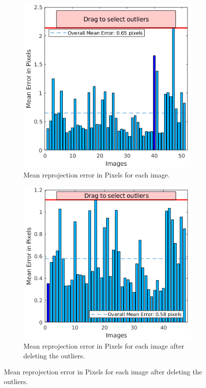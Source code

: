 \begin{figure}[H]
	\centering
	\begin{subfigure}[b]{0.45\textwidth}
		\includegraphics[width=\textwidth]{graphics/stats.png}
		\caption{Mean reprojection error in Pixels for each image.}
		\label{fig:stats}
	\end{subfigure}
	\qquad
	\begin{subfigure}[b]{0.45\textwidth}
		\includegraphics[width=\textwidth]{graphics/stats_improved.png}
		\caption{Mean reprojection error in Pixels for each image after deleting the outliers.}
		\label{fig:statsimproved}
	\end{subfigure}
\end{figure}


